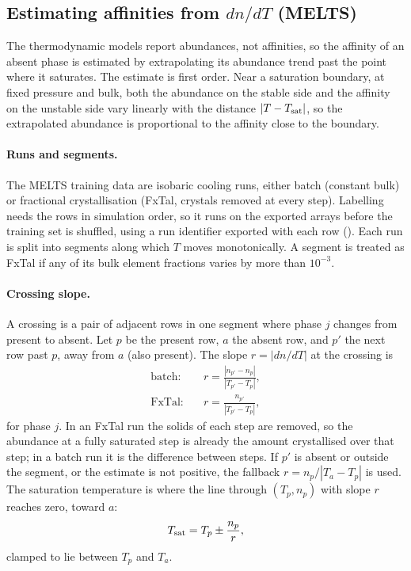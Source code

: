 \documentclass[11pt]{article}
\newcommand{\code}[1]{\texttt{\detokenize{#1}}}
\begin{document}
\subsection{Estimating affinities from $dn/dT$ (MELTS)}

The thermodynamic models report abundances, not affinities, so the affinity of an absent
phase is estimated by extrapolating its abundance trend past the point where it saturates.
The estimate is first order. Near a saturation boundary, at fixed pressure and bulk, both the
abundance on the stable side and the affinity on the unstable side vary linearly with the
distance $|T - T_{\rm sat}|$, so the extrapolated abundance is proportional to the affinity
close to the boundary.

\paragraph{Runs and segments.}
The MELTS training data are isobaric cooling runs, either batch (constant bulk) or
fractional crystallisation (FxTal, crystals removed at every step). Labelling needs the rows
in simulation order, so it runs on the exported arrays before the training set is shuffled,
using a run identifier exported with each row (\code{run_ids}). Each run is split into
segments along which $T$ moves monotonically. A segment is treated as FxTal if any of its
bulk element fractions varies by more than $10^{-3}$.

\paragraph{Crossing slope.}
A crossing is a pair of adjacent rows in one segment where phase $j$ changes from present
to absent. Let $p$ be the present row, $a$ the absent row, and $p'$ the next row past $p$,
away from $a$ (also present). The slope $r = |dn/dT|$ at the crossing is
\begin{align}
  \text{batch:}\quad & r = \frac{|n_{p'} - n_p|}{|T_{p'} - T_p|}, \label{eq:rbatch}\\
  \text{FxTal:}\quad & r = \frac{n_{p'}}{|T_{p'} - T_p|}, \label{eq:rfx}
\end{align}
for phase $j$. In an FxTal run the solids of each step are removed, so the abundance at a
fully saturated step is already the amount crystallised over that step; in a batch run it
is the difference between steps. If $p'$ is absent or outside the segment, or the estimate is not positive,
the fallback $r = n_p / |T_a - T_p|$ is used. The saturation temperature is where the line
through $(T_p, n_p)$ with slope $r$ reaches zero, toward $a$:
\begin{equation}
  T_{\rm sat} = T_p \pm \frac{n_p}{r},
\end{equation}
clamped to lie between $T_p$ and $T_a$.
\end{document}
